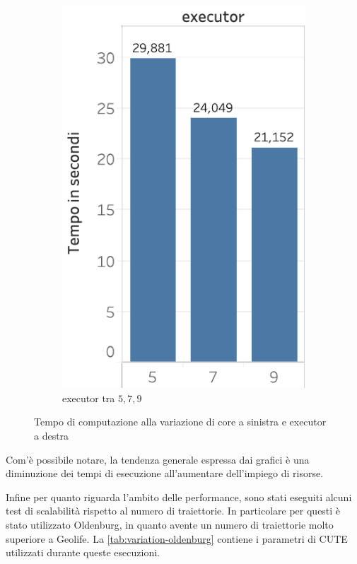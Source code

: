\begin{figure}
\begin{subfigure}{.5\textwidth}
  \centering
   \includegraphics[scale=0.5]{res/fig/sec-4/scalability/ScalabilityDataEXECUTORS.pdf}
  \caption{executor tra \(5,7,9\)}%
  \label{fig:chap-4:ScalabilityEXECUTORS}
  \end{subfigure}%
  \caption{Tempo di computazione alla variazione di core a sinistra e executor a destra}%
  \label{fig:chap-4:ScalabilityCORESandEXECUTORS}
\end{figure}

Com'è possibile notare, la tendenza generale espressa dai grafici è una diminuzione dei tempi di esecuzione all'aumentare dell'impiego di risorse.

Infine per quanto riguarda l'ambito delle performance, sono stati eseguiti alcuni test di scalabilità rispetto al numero di traiettorie.
In particolare per questi è stato utilizzato Oldenburg, in quanto avente un numero di traiettorie molto superiore a Geolife.
La \cref{tab:variation-oldenburg} contiene i parametri di CUTE utilizzati durante queste esecuzioni.

